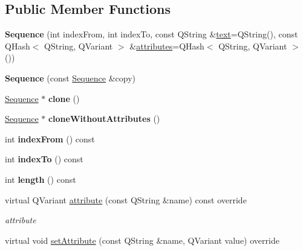 \subsection*{Public Member Functions}
\begin{DoxyCompactItemize}
\item 
\mbox{\label{class_sequence_a7b62d42c5c2d9662fd1549229e518d3d}} 
{\bfseries Sequence} (int index\+From, int index\+To, const Q\+String \&\hyperlink{class_annotation_element_aa59bd98501e3882990681f6aff2ee863}{text}=Q\+String(), const Q\+Hash$<$ Q\+String, Q\+Variant $>$ \&\hyperlink{class_annotation_element_a58082d92f50c4fde2d18ce24ef3fd283}{attributes}=Q\+Hash$<$ Q\+String, Q\+Variant $>$())
\item 
\mbox{\label{class_sequence_ae106d2fd1e8a2858e30412d4803e22f4}} 
{\bfseries Sequence} (const \hyperlink{class_sequence}{Sequence} \&copy)
\item 
\mbox{\label{class_sequence_a0f33fb453d2679fa023138aff62bba9c}} 
\hyperlink{class_sequence}{Sequence} $\ast$ {\bfseries clone} ()
\item 
\mbox{\label{class_sequence_a3056f0993ce983f93b5fb489c81a350b}} 
\hyperlink{class_sequence}{Sequence} $\ast$ {\bfseries clone\+Without\+Attributes} ()
\item 
\mbox{\label{class_sequence_a12dd06fab447e2dc5662b452c0397c4c}} 
int {\bfseries index\+From} () const
\item 
\mbox{\label{class_sequence_a996e9ce8e75718b6c5d385d3d5c44e16}} 
int {\bfseries index\+To} () const
\item 
\mbox{\label{class_sequence_ae56ca4ca9c4e02dc83810c733870f8e9}} 
int {\bfseries length} () const
\item 
virtual Q\+Variant \hyperlink{class_sequence_a415f655b5985fa47499a7f665ce7c2d4}{attribute} (const Q\+String \&name) const override
\begin{DoxyCompactList}\small\item\em attribute \end{DoxyCompactList}\item 
virtual void \hyperlink{class_sequence_a0c573124c566aa3a28c63fb362f58c6b}{set\+Attribute} (const Q\+String \&name, Q\+Variant value) override

\end{DoxyCompactItemize}
